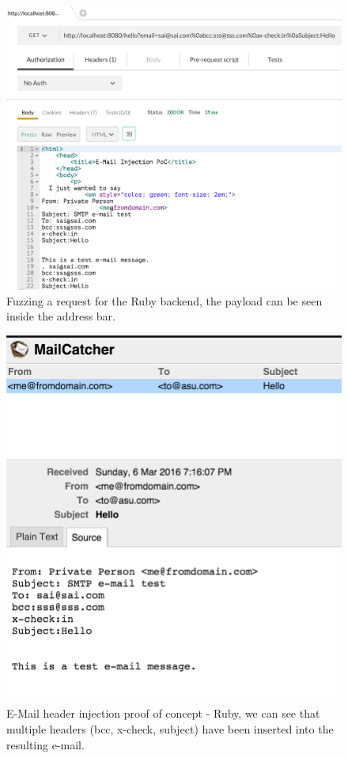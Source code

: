 \begin{figure}[!htbp]
	\centering
	\includegraphics[width=\linewidth]{System/EMI_Postman_Ruby}
	\caption[]{Fuzzing a request for the Ruby backend, the payload can be seen inside the address bar.}
	\label{fig:postmanruby}
\end{figure}

\begin{figure}[!htbp]
	\centering
	\includegraphics[width=\linewidth]{System/EMI_Mailcatcher_Ruby}
	\caption[]{E-Mail header injection proof of concept - Ruby, we can see that multiple headers (bcc, x-check, subject) have been inserted into the resulting e-mail.}
	\label{fig:mailcatcherruby}
\end{figure}
